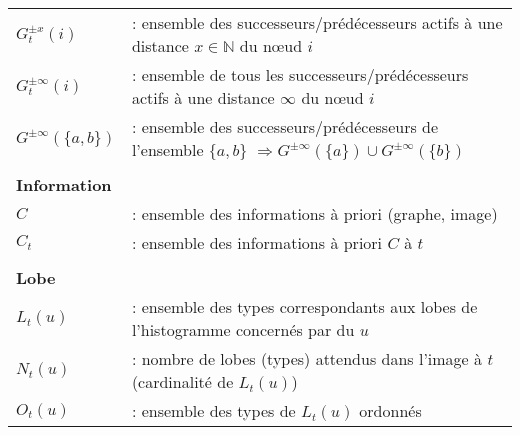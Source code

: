 \begin{center}
\begin{tabular}{ l l }
	$G_t^{\pm x}(i)$& : ensemble des successeurs/prédécesseurs actifs à une distance $x\in \mathbb{N}$ du n\oe{}ud $i$ \\
	$G_t^{\pm \infty}(i)$& : ensemble de tous les successeurs/prédécesseurs actifs à une distance $\infty$ du n\oe{}ud $i$ \\
	$G^{\pm \infty}( \{ a, b \} )$& : ensemble des successeurs/prédécesseurs de l'ensemble $\{ a, b \}$ $\Rightarrow G^{\pm \infty}( \{ a \} ) \cup G^{\pm \infty}( \{ b \} ) $ \\


\\\textbf{Information} \\
	$C$			& : ensemble des informations à priori (graphe, image) \\
	$C_t$ 		& : ensemble des informations à priori $C$ à $t$ \\
\\\textbf{Lobe} \\
	$L_t(u)$ 	& : ensemble des types correspondants aux lobes de l'histogramme concernés par du $u$ \\
	$N_t(u)$	& : nombre de lobes (types) attendus dans l'image à $t$ (cardinalité de $L_t(u)$) \\
	$O_t(u)$ 	& : ensemble des types de $L_t(u)$ ordonnés\\


	\end{tabular}
	\end{center}	 


